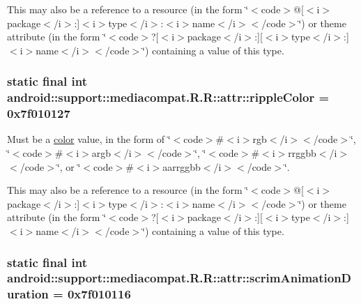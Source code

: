This may also be a reference to a resource (in the form \char`\"{}$<$code$>$@\mbox{[}$<$i$>$package$<$/i$>$:\mbox{]}$<$i$>$type$<$/i$>$:$<$i$>$name$<$/i$>$$<$/code$>$\char`\"{}) or theme attribute (in the form \char`\"{}$<$code$>$?\mbox{[}$<$i$>$package$<$/i$>$:\mbox{]}\mbox{[}$<$i$>$type$<$/i$>$:\mbox{]}$<$i$>$name$<$/i$>$$<$/code$>$\char`\"{}) containing a value of this type. \hypertarget{classandroid_1_1support_1_1mediacompat_1_1_r_1_1attr_627e3324d4eb39e16bd195d0d0fc0e97}{
\subsubsection[{rippleColor}]{\setlength{\rightskip}{0pt plus 5cm}static final int android::support::mediacompat.R.R::attr::rippleColor = 0x7f010127}}
\label{classandroid_1_1support_1_1mediacompat_1_1_r_1_1attr_627e3324d4eb39e16bd195d0d0fc0e97}


Must be a \hyperlink{classandroid_1_1support_1_1mediacompat_1_1_r_1_1color}{color} value, in the form of \char`\"{}$<$code$>$\#$<$i$>$rgb$<$/i$>$$<$/code$>$\char`\"{}, \char`\"{}$<$code$>$\#$<$i$>$argb$<$/i$>$$<$/code$>$\char`\"{}, \char`\"{}$<$code$>$\#$<$i$>$rrggbb$<$/i$>$$<$/code$>$\char`\"{}, or \char`\"{}$<$code$>$\#$<$i$>$aarrggbb$<$/i$>$$<$/code$>$\char`\"{}. 

This may also be a reference to a resource (in the form \char`\"{}$<$code$>$@\mbox{[}$<$i$>$package$<$/i$>$:\mbox{]}$<$i$>$type$<$/i$>$:$<$i$>$name$<$/i$>$$<$/code$>$\char`\"{}) or theme attribute (in the form \char`\"{}$<$code$>$?\mbox{[}$<$i$>$package$<$/i$>$:\mbox{]}\mbox{[}$<$i$>$type$<$/i$>$:\mbox{]}$<$i$>$name$<$/i$>$$<$/code$>$\char`\"{}) containing a value of this type. \hypertarget{classandroid_1_1support_1_1mediacompat_1_1_r_1_1attr_270a859bf2dee23c2db5c9fc20eac24b}{
\subsubsection[{scrimAnimationDuration}]{\setlength{\rightskip}{0pt plus 5cm}static final int android::support::mediacompat.R.R::attr::scrimAnimationDuration = 0x7f010116}}
\label{classandroid_1_1support_1_1mediacompat_1_1_r_1_1attr_270a859bf2dee23c2db5c9fc20eac24b}


